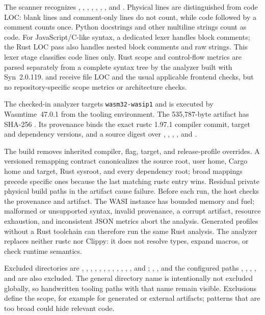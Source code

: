The scanner recognizes , , , ,
, , , and . Physical lines are
distinguished from code LOC: blank lines and comment-only lines do not count,
while code followed by a comment counts once. Python docstrings and other
multiline strings count as code. For JavaScript/C-like syntax, a dedicated
lexer handles block comments; the Rust LOC pass also handles nested block
comments and raw strings. This lexer stage classifies code lines only. Rust
scope and control-flow metrics are parsed separately from a complete syntax
tree by the analyzer built with Syn~2.0.119.  and 
receive file LOC and the usual applicable frontend checks, but no
repository-specific scope metrics or architecture checks.

The checked-in analyzer targets \texttt{wasm32-wasip1} and is executed by
Wasmtime~47.0.1 from the tooling environment. The 535,787-byte artifact has
SHA-256
.
Its provenance binds the exact rustc 1.97.1 compiler commit, target and
dependency versions, and a source digest over ,
, , , and
.

The build removes inherited compiler, flag, target, and release-profile
overrides. A versioned remapping contract canonicalizes the source root, user
home, Cargo home and target, Rust sysroot, and every dependency root; broad
mappings precede specific ones because the last matching rustc entry wins.
Residual private physical build paths in the artifact cause failure. Before
each run, the host checks the provenance and artifact. The WASI instance has
bounded memory and fuel; malformed or unsupported syntax, invalid provenance,
a corrupt artifact, resource exhaustion, and inconsistent JSON metrics abort
the analysis. Generated profiles without a Rust toolchain can therefore run
the same Rust analysis. The analyzer replaces neither rustc nor Clippy: it
does not resolve types, expand macros, or check runtime semantics.

Excluded directories are , , ,
, , , ,
, , , ,
, and ; ,
, and the configured paths ,
, , , and
 are also excluded. The general directory name
 is intentionally not excluded globally, so handwritten tooling
paths with that name remain visible. Exclusions define the scope, for example
for generated or external artifacts; patterns that are too broad could hide
relevant code.

